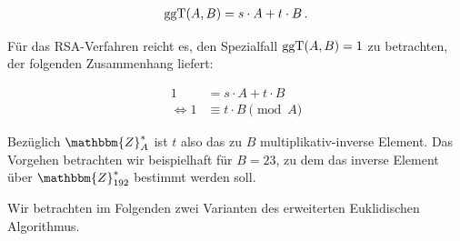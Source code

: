 \begin{align*}
	\operatorname{ggT}(A, B) = s \cdot A + t \cdot B\, .
\end{align*}

Für das RSA-Verfahren reicht es, den Spezialfall $\operatorname{ggT}(A,B) = 1$ zu betrachten, der folgenden Zusammenhang liefert:

\begin{align*}
	1 &= s \cdot A + t \cdot B\\
	\Leftrightarrow 1 &\equiv t \cdot B \pmod A
\end{align*}

Bezüglich $\mathbbm{Z}^*_{A}$ ist $t$ also das zu $B$
multiplikativ-inverse Element. Das Vorgehen betrachten wir beispielhaft
für $B = 23$, zu dem das inverse Element über $\mathbbm{Z}^{\ast}_{192}$
bestimmt werden soll.

Wir betrachten im Folgenden zwei Varianten des erweiterten Euklidischen
Algorithmus.

